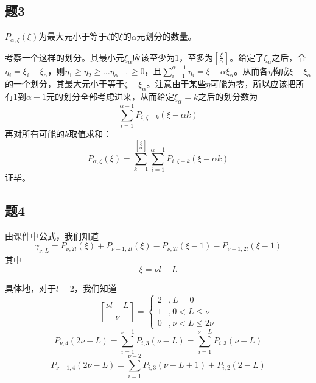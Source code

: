 \documentclass{ctexart}
\begin{document}
	\subsection{题3}
	
	$P_{\alpha,\zeta}(\xi)$为最大元小于等于$\zeta$的$\xi$的$\alpha$元划分的数量。
	
	考察一个这样的划分。其最小元$\xi_\alpha$应该至少为$1$，至多为$\left[\frac{\xi}{\alpha}\right]$。给定了$\xi_\alpha$之后，令$\eta_i=\xi_i-\xi_\alpha$，则$\eta_1\geq \eta_2\geq\dots\eta_{\alpha-1}\geq 0$，且$\sum_{i=1}^{\alpha-1}\eta_i=\xi-\alpha\xi_\alpha$。从而各$\eta$构成$\xi-\xi_\alpha$的一个划分，其最大元小于等于$\zeta-\xi_\alpha$。注意由于某些$\eta$可能为零，所以应该把所有$1$到$\alpha-1$元的划分全部考虑进来，从而给定$\xi_\alpha=k$之后的划分数为
	\begin{equation}
	\sum_{i=1}^{\alpha-1}P_{i,\zeta-k}(\xi-\alpha k)
	\end{equation}
	再对所有可能的$k$取值求和：
	\begin{equation}
	P_{\alpha,\zeta}(\xi)=\sum_{k=1}^{\left[\frac{\xi}{\alpha}\right]}\sum_{i=1}^{\alpha-1}P_{i,\zeta-k}(\xi-\alpha k)
	\end{equation}
	证毕。
	
	\subsection{题4}
	
	由课件中公式，我们知道
	\begin{equation}
	\gamma_{\nu,L}=P_{\nu,2l}(\xi)+P_{\nu-1,2l}(\xi)-P_{\nu,2l}(\xi-1)-P_{\nu-1,2l}(\xi-1)
	\end{equation}
	其中
	\begin{equation}
	\xi = \nu l-L
	\end{equation}
	
	具体地，对于$l=2$，我们知道
	\begin{equation}
	\left[\frac{\nu l-L}{\nu}\right]=\begin{cases}2 & ,L=0 \\ 1 & ,0 < L\leq \nu\\ 0 & ,\nu < L \leq 2\nu\end{cases}
	\end{equation}
	\begin{equation}
	P_{\nu,4}(2\nu-L)=\sum_{i=1}^{\nu-1}P_{i,3}(\nu-L)=\sum_{i=1}^{\nu-L}P_{i,3}(\nu-L)
	\end{equation}
	\begin{equation}
	P_{\nu-1,4}(2\nu-L)=\sum_{i=1}^{\nu-2}P_{i,3}(\nu-L+1)+P_{i,2}(2-L)
	\end{equation}
	
\end{document}
